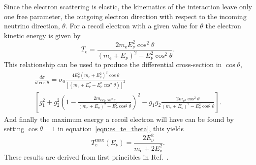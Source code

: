 Since the electron scattering is elastic, the kinematics of the interaction
leave only one free parameter, the outgoing electron direction with respect
to the incoming neutrino direction, $\theta$.
For a recoil electron with a given value for $\theta$ the electron kinetic energy is
given by
\begin{equation}
    T_{\mathrm{e}}=\frac{2m_{\mathrm{e}}E_{\nu}^{2}\cos^{2}\theta}{(m_{\mathrm{e}}+E_{\nu})^2 - E_{\nu}^{2}\cos^2\theta}\text{.}
    \label{eqn:es_te_theta}
\end{equation}
This relationship can be used to produce the differential cross-section in $\cos\theta$,
\begin{multline}
\frac{d\sigma}{d\cos\theta}=\sigma_{0}\frac{4E_{\nu}^{2}(m_{\mathrm{e}}+E_{\nu}^{2})^2\cos\theta}{\left[(m_{\mathrm{e}}+E_{\nu}^{2} -E_{\nu}^{2}\cos^2\theta)\right]^2}\\
    \left[g_{1}^{2} + g_{2}^{2}\left(1 - \frac{2m_{\mathrm{e}E_{\nu}\cos^{2}\theta}}{(m_{\mathrm{e}}+E_{\nu})^2 -E_{\nu}^{2}\cos^2\theta} \right)^{2} - g_{1}g_{2}\frac{2m_{\mathrm{e}^{2}}\cos^{2}\theta}{(m_{\mathrm{e}}+E_{\nu})^{2}-E_{\nu}^{2}\cos^{2}\theta}\right]
    \text{.}
\end{multline}
And finally the maximum energy a recoil electron will have can be found by
setting $\cos\theta=1$ in equation~\eqref{eqn:es_te_theta}, this yields
\begin{equation}
    T_{e}^{\max}(E_\nu) = \frac{2E_{\nu}^{2}}{m_{\mathrm{e}}+ 2E_{\nu}^{2} }\text{.}
\end{equation}
These results are derived from first princibles in Ref.~\cite{giuntikim}.

